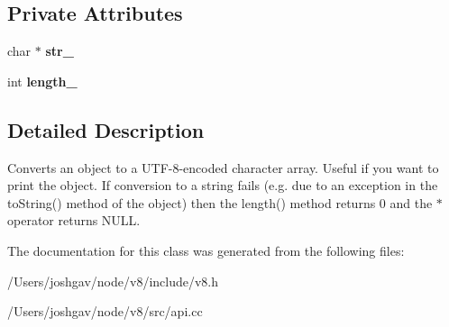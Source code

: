 \subsection*{Private Attributes}
\begin{DoxyCompactItemize}
\item 
char $\ast$ {\bfseries str\+\_\+}\hypertarget{classv8_1_1_string_1_1_utf8_value_a474e69f2de2bedc21bc99da7f834b9a4}{}\label{classv8_1_1_string_1_1_utf8_value_a474e69f2de2bedc21bc99da7f834b9a4}

\item 
int {\bfseries length\+\_\+}\hypertarget{classv8_1_1_string_1_1_utf8_value_a978cd108332a3fc9956f08eadb18c080}{}\label{classv8_1_1_string_1_1_utf8_value_a978cd108332a3fc9956f08eadb18c080}

\end{DoxyCompactItemize}


\subsection{Detailed Description}
Converts an object to a U\+T\+F-\/8-\/encoded character array. Useful if you want to print the object. If conversion to a string fails (e.\+g. due to an exception in the to\+String() method of the object) then the length() method returns 0 and the $\ast$ operator returns N\+U\+LL. 

The documentation for this class was generated from the following files\+:\begin{DoxyCompactItemize}
\item 
/\+Users/joshgav/node/v8/include/v8.\+h\item 
/\+Users/joshgav/node/v8/src/api.\+cc\end{DoxyCompactItemize}

